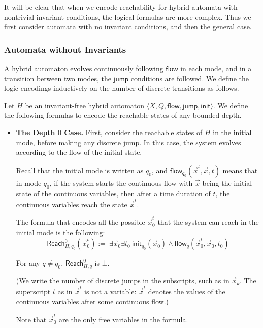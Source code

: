 \documentclass[envcountsect]{llncs}
\newcommand{\flow}{\mathsf{flow}}
\newcommand{\jump}{\mathsf{jump}}
\newcommand{\init}{\mathsf{init}}
\newcommand{\reach}{\mathsf{Reach}}
\begin{document}
It will be clear that when we encode reachability for hybrid automata with
nontrivial invariant conditions, the logical formulas are more complex. Thus we
first consider automata with no invariant conditions, and then the general
case. 


\subsubsection{Automata without Invariants}

A hybrid automaton evolves continuously following $\flow$ in each mode, and in
a transition between two modes, the $\jump$ conditions are followed. We define
the logic encodings inductively on the number of discrete transitions as
follows. 

\begin{definition}[$\reach_H^n(\vec x)$, Invariant-Free Case]

Let $H$ be an invariant-free hybrid automaton $\langle X, Q, \flow,
\jump,\init\rangle$. We define the following formulas to encode the reachable
states of any bounded depth.  

\begin{itemize}
\item {\bf The Depth $0$ Case.} First, consider the reachable states of $H$ in
the initial mode, before making any discrete jump. In this case, the system
evolves according to the flow of the initial state. 

Recall that the initial mode is written as $q_0$, and $\flow_{q_0}(\vec x^t,
\vec x, t)$ means that in mode $q_0$, if the system starts the continuous flow
with $\vec x$ being the initial state of the continuous variables, then after a
time duration of $t$, the continuous variables reach the state $\vec x^t$. 

The formula that encodes all the possible $\vec x_0^t$ that the system can
reach in the initial mode is the following:
\[
\reach^0_{H,q_0} (\vec x_0^t):=\ \exists \vec x_0 \exists t_0\ \init_{q_0}(\vec
x_0)\wedge \flow_q(\vec x_0^t, \vec x_0, t_0)
\]

For any $q\neq q_0$, $\reach^0_{H,q}$ is $\bot$. 

(We write the number of discrete jumps in the subscripts, such as in $\vec
x_k$. The superscript $t$ as in $\vec x^t$ is not a variable: $\vec x^t$ denotes
the values of the continuous variables after some continuous flow.)


Note that $\vec x_0^t$ are the only free variables in the formula. 




\end{itemize}
\end{definition}
\end{document}
